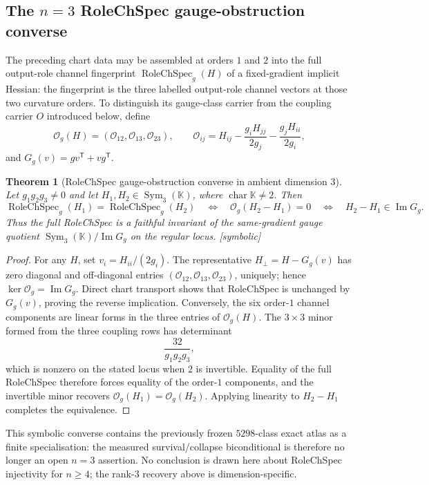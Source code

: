 \documentclass[11pt]{article}
\newcommand{\Symbolic}{\textsf{[symbolic]}}
\theoremstyle{plain}
\newtheorem{theorem}{Theorem}
\theoremstyle{definition}
\begin{document}
\subsection{The \texorpdfstring{$n=3$}{n=3} RoleChSpec gauge-obstruction converse}
The preceding chart data may be assembled at orders $1$ and $2$ into the full output-role channel
fingerprint $\operatorname{RoleChSpec}_g(H)$ of a fixed-gradient implicit Hessian: the fingerprint is
the three labelled output-role channel vectors at those two curvature orders.  To distinguish its
gauge-class carrier from the coupling carrier $O$ introduced below, define
\[
\mathcal O_g(H)=(\mathcal O_{12},\mathcal O_{13},\mathcal O_{23}),\qquad
\mathcal O_{ij}=H_{ij}-\frac{g_iH_{jj}}{2g_j}-\frac{g_jH_{ii}}{2g_i},
\]
and $G_g(v)=gv^{\mathsf T}+vg^{\mathsf T}$.

\begin{theorem}[RoleChSpec gauge-obstruction converse in ambient dimension $3$]
\label{thm:rolechspec-converse}
Let $g_1g_2g_3\ne0$ and let $H_1,H_2\in\operatorname{Sym}_3(\mathbb K)$, where
$\operatorname{char}\mathbb K\ne2$.  Then
\[
\operatorname{RoleChSpec}_g(H_1)=\operatorname{RoleChSpec}_g(H_2)
\quad\Longleftrightarrow\quad
\mathcal O_g(H_2-H_1)=0
\quad\Longleftrightarrow\quad
H_2-H_1\in\operatorname{Im}G_g .
\]
Thus the full RoleChSpec is a faithful invariant of the same-gradient gauge quotient
$\operatorname{Sym}_3(\mathbb K)/\operatorname{Im}G_g$ on the regular locus. \Symbolic
\end{theorem}

\begin{proof}
For any $H$, set $v_i=H_{ii}/(2g_i)$.  The representative
$H_\perp=H-G_g(v)$ has zero diagonal and off-diagonal entries
$(\mathcal O_{12},\mathcal O_{13},\mathcal O_{23})$, uniquely; hence
$\ker\mathcal O_g=\operatorname{Im}G_g$.  Direct chart transport shows that RoleChSpec is unchanged by
$G_g(v)$, proving the reverse implication.  Conversely, the six order-$1$ channel components are
linear forms in the three entries of $\mathcal O_g(H)$.  The $3\times3$ minor formed from the three
coupling rows has determinant
\[
\frac{32}{g_1g_2g_3},
\]
which is nonzero on the stated locus when $2$ is invertible.  Equality of the full RoleChSpec therefore
forces equality of the order-$1$ components, and the invertible minor recovers
$\mathcal O_g(H_1)=\mathcal O_g(H_2)$.  Applying linearity to $H_2-H_1$ completes the equivalence.
\end{proof}

This symbolic converse contains the previously frozen $5298$-class exact atlas as a finite
specialisation: the measured survival/collapse biconditional is therefore no longer an open
$n=3$ assertion.  No conclusion is drawn here about RoleChSpec injectivity for $n\ge4$; the rank-$3$
recovery above is dimension-specific.
\end{document}
